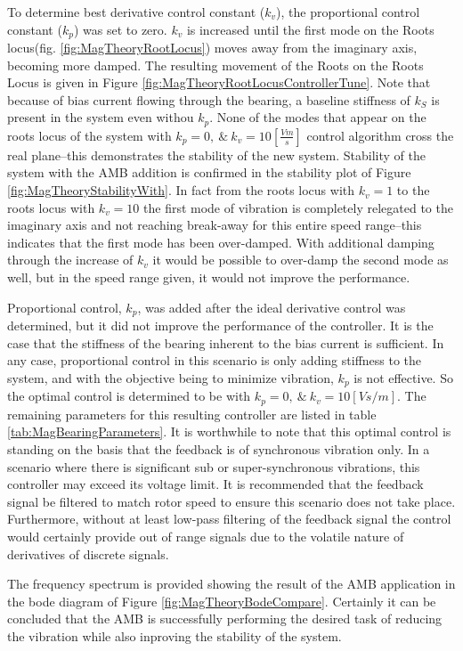  To determine best derivative control constant ($ k_v $), the proportional control constant ($ k_p $) was set to zero. $ k_v $ is increased until the first mode on the Roots locus(fig. \ref{fig:MagTheoryRootLocus}) moves away from the imaginary axis, becoming more damped. The resulting movement of the Roots on the Roots Locus is given in Figure \ref{fig:MagTheoryRootLocusControllerTune}. Note that because of bias current flowing through the bearing, a baseline stiffness of $ k_S $ is present in the system even withou $ k_p $. None of the modes that appear on the roots locus of the system with $ k_p=0,\ \&\ k_v=10[\frac{Vm}{s}] $ control algorithm cross the real plane--this demonstrates the stability of the new system. Stability of the system with the AMB addition is confirmed in the stability plot of Figure \ref{fig:MagTheoryStabilityWith}. In fact from the roots locus with $ k_v=1 $ to the roots locus with $ k_v=10 $ the first mode of vibration is completely relegated to the imaginary axis and not reaching break-away for this entire speed range--this indicates that the first mode has been over-damped. With additional damping through the increase of $ k_v $ it would be possible to over-damp the second mode as well, but in the speed range given, it would not improve the performance.\par 
 Proportional control, $ k_p $, was added after the ideal derivative control was determined, but it did not improve the performance of the controller. It is the case that the stiffness of the bearing inherent to the bias current is sufficient. In any case, proportional control in this scenario is only adding stiffness to the system, and with the objective being to minimize vibration, $ k_p $ is not effective. So the optimal control is determined to be with $ k_p=0,\ \&\ k_v=10[Vs/m] $. The remaining parameters for this resulting controller are listed in table \ref{tab:MagBearingParameters}. It is worthwhile to note that this optimal control is standing on the basis that the feedback is of synchronous vibration only. In a scenario where there is significant sub or super-synchronous vibrations, this controller may exceed its voltage limit. It is recommended that the feedback signal be filtered to match rotor speed to ensure this scenario does not take place. Furthermore, without at least low-pass filtering of the feedback signal the control would certainly provide out of range signals due to the volatile nature of derivatives of discrete signals.\par 
 The frequency spectrum is provided showing the result of the AMB application in the bode diagram of Figure \ref{fig:MagTheoryBodeCompare}. Certainly it can be concluded that the AMB is successfully performing the desired task of reducing the vibration while also inproving the stability of the system.\par 
